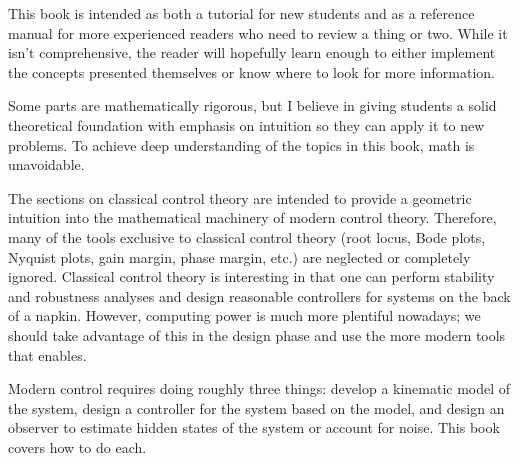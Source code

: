 This book is intended as both a tutorial for new students and as a reference
manual for more experienced readers who need to review a thing or two. While it
isn't comprehensive, the reader will hopefully learn enough to either implement
the concepts presented themselves or know where to look for more information.

Some parts are mathematically rigorous, but I believe in giving students a solid
theoretical foundation with emphasis on intuition so they can apply it to new
problems. To achieve deep understanding of the topics in this book, math is
unavoidable.

The sections on classical control theory are intended to provide a geometric
intuition into the mathematical machinery of modern control theory. Therefore,
many of the tools exclusive to classical control theory (root locus, Bode plots,
Nyquist plots, gain margin, phase margin, etc.) are neglected or completely
ignored. Classical control theory is interesting in that one can perform
stability and robustness analyses and design reasonable controllers for systems
on the back of a napkin. However, computing power is much more plentiful
nowadays; we should take advantage of this in the design phase and use the more
modern tools that enables.

Modern control requires doing roughly three things: develop a kinematic model of
the system, design a controller for the system based on the model, and design
an observer to estimate hidden states of the system or account for noise. This
book covers how to do each.
